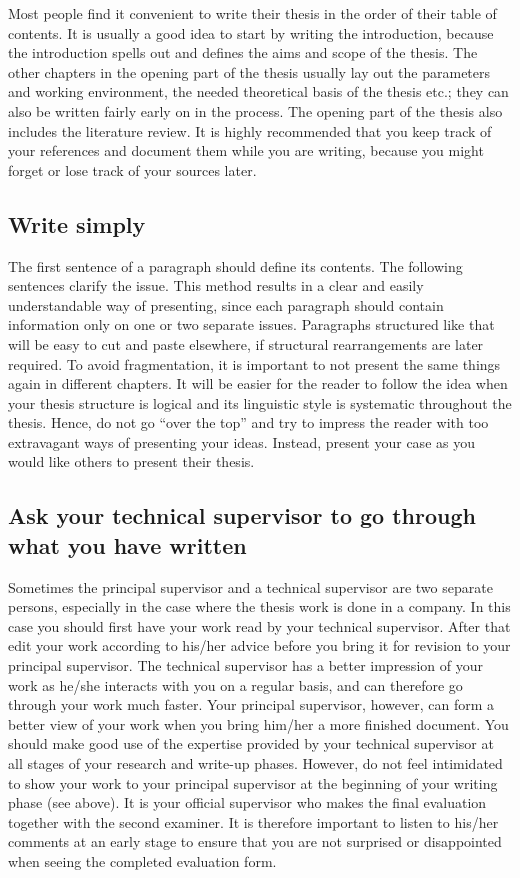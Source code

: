 Most people find it convenient to write their thesis in the order of
their table of contents. It is usually a good idea to start by
writing the introduction, because the introduction spells out and
defines the aims and scope of the thesis. The other chapters in the
opening part of the thesis usually lay out the parameters and working
environment, the needed theoretical basis of the thesis etc.; they
can also be written fairly early on in the process. The opening part
of the thesis also includes the literature review. It is highly
recommended that you keep track of your references and document them
while you are writing, because you might forget or lose track of your
sources later.

\subsection{Write simply}

The first sentence of a paragraph should define its contents. The
following sentences clarify the issue. This method results in a clear
and easily understandable way of presenting, since each paragraph
should contain information only on one or two separate issues.
Paragraphs structured like that will be easy to cut and paste
elsewhere, if structural rearrangements are later required. To avoid
fragmentation, it is important to not present the same things again
in different chapters. It will be easier for the reader to follow the
idea when your thesis structure is logical and its linguistic style
is systematic throughout the thesis. Hence, do not go “over the top”
and try to impress the reader with too extravagant ways of presenting
your ideas. Instead, present your case as you would like others to
present their thesis.

\subsection{Ask your technical supervisor to go through what you have written}

Sometimes the principal supervisor and a technical supervisor are two
separate persons, especially in the case where the thesis work is
done in a company. In this case you should first have your work read
by your technical supervisor. After that edit your work according to
his/her advice before you bring it for revision to your principal
supervisor. The technical supervisor has a better impression of your
work as he/she interacts with you on a regular basis, and can
therefore go through your work much faster. Your principal
supervisor, however, can form a better view of your work when you
bring him/her a more finished document. You should make good use of
the expertise provided by your technical supervisor at all stages of
your research and write-up phases. However, do not feel intimidated
to show your work to your principal supervisor at the beginning of
your writing phase (see  above). It is your
official supervisor who makes the final evaluation together with the
second examiner. It is therefore important to listen to his/her
comments at an early stage to ensure that you are not surprised or
disappointed when seeing the completed evaluation form.

